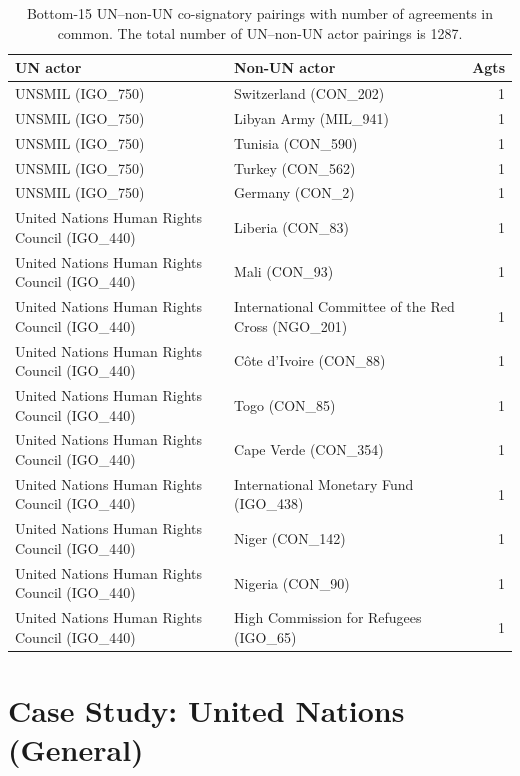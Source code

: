 \documentclass{article}
\begin{document}
\begin{table}[H]
\begin{center}
\small
\begin{tabularx}{\textwidth}{|X|X|r|}
    \hline
    \textbf{UN actor} & \textbf{Non-UN actor} & \textbf{Agts} \\
    \hline
    \hline
UNSMIL (IGO\_750) & Switzerland (CON\_202) & 1 \\
\hline
UNSMIL (IGO\_750) & Libyan Army (MIL\_941) & 1 \\
\hline
UNSMIL (IGO\_750) & Tunisia (CON\_590) & 1 \\
\hline
UNSMIL (IGO\_750) & Turkey (CON\_562) & 1 \\
\hline
UNSMIL (IGO\_750) & Germany (CON\_2) & 1 \\
\hline
United Nations Human Rights Council (IGO\_440) & Liberia (CON\_83) & 1 \\
\hline
United Nations Human Rights Council (IGO\_440) & Mali (CON\_93) & 1 \\
\hline
United Nations Human Rights Council (IGO\_440) & International Committee of the Red Cross (NGO\_201) & 1 \\
\hline
United Nations Human Rights Council (IGO\_440) & Côte d’Ivoire (CON\_88) & 1 \\
\hline
United Nations Human Rights Council (IGO\_440) & Togo (CON\_85) & 1 \\
\hline
United Nations Human Rights Council (IGO\_440) & Cape Verde (CON\_354) & 1 \\
\hline
United Nations Human Rights Council (IGO\_440) & International Monetary Fund (IGO\_438) & 1 \\
\hline
United Nations Human Rights Council (IGO\_440) & Niger (CON\_142) & 1 \\
\hline
United Nations Human Rights Council (IGO\_440) & Nigeria (CON\_90) & 1 \\
\hline
United Nations Human Rights Council (IGO\_440) & High Commission for Refugees (IGO\_65) & 1 \\
\hline
\end{tabularx}
\end{center}
\normalsize
\caption{Bottom-15 UN--non-UN co-signatory pairings with number of agreements in common. The total number of UN--non-UN actor pairings is 1287.}
\end{table}

\pagebreak

\section{Case Study: United Nations (General) }
\end{document}
